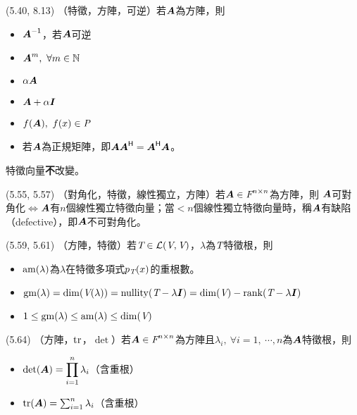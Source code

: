\item \begin{theorem}{(5.40, 8.13)} （特徵，方陣，可逆）若$\boldsymbol{A}$為方陣，則
	\begin{itemize}
		\item $\boldsymbol{A}^{\mathsf{-1}}$，若$\boldsymbol{A}$可逆
		\item $\boldsymbol{A}^m, \ \forall m \in \mathbb{N}$
		\item $\alpha\boldsymbol{A}$
		\item $\boldsymbol{A} + \alpha\boldsymbol{I}$
		\item $f(\boldsymbol{A}), \ f(x) \in \textit{P}$
		\item 若$\boldsymbol{A}$為正規矩陣，即$\boldsymbol{A}\boldsymbol{A}^{\mathsf{H}} = \boldsymbol{A}^{\mathsf{H}}\boldsymbol{A}$。
	\end{itemize}
	特徵向量\textbf{不}改變。
\end{theorem}

\item \begin{theorem}{(5.55, 5.57)} （對角化，特徵，線性獨立，方陣）若$\boldsymbol{A} \in \textit{F}^{n \times n}$為方陣，則
	$\boldsymbol{A}$可對角化$\iff$$\boldsymbol{A}$有$n$個線性獨立特徵向量；當$< n$個線性獨立特徵向量時，稱$\boldsymbol{A}$有缺陷（defective），即$\boldsymbol{A}$不可對角化。
\end{theorem}

\item \begin{theorem}{(5.59, 5.61)} （方陣，特徵）若$\textit{T} \in \mathcal{L}(\textit{V}, \textit{V})$，$\lambda$為$\textit{T}$特徵根，則
	\begin{itemize}
		\item $\operatorname{am}(\lambda)$為$\lambda$在特徵多項式$p_{\textit{T}}(x)$的重根數。
		\item $\operatorname{gm}(\lambda) = \dim(\textit{V}(\lambda)) = \operatorname{nullity}(\textit{T} - \lambda\boldsymbol{I}) = \dim(\textit{V}) - \operatorname{rank}(\textit{T} - \lambda\boldsymbol{I})$
		\item $1 \le \operatorname{gm}(\lambda) \le \operatorname{am}(\lambda) \le \dim(\textit{V})$
	\end{itemize}
\end{theorem}

\item \begin{theorem}{(5.64)} （方陣，$\operatorname{tr}$，$\det$）若$\boldsymbol{A} \in \textit{F}^{n \times n}$為方陣且$\lambda_i, \ \forall i = 1, \ \cdots, n$為$\boldsymbol{A}$特徵根，則
	\begin{itemize}
		\item $\det(\boldsymbol{A}) = \displaystyle \prod_{i = 1}^{n}\lambda_i$（含重根）
		\item $\operatorname{tr}(\boldsymbol{A}) = \sum_{i = 1}^{n}\lambda_i$（含重根）
	\end{itemize}
\end{theorem}

